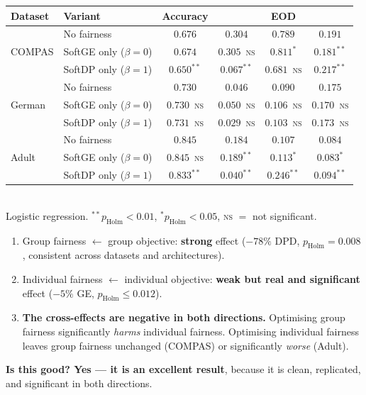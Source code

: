 \begin{center}
\scriptsize
\renewcommand{\arraystretch}{1.15}
\begin{tabular}{@{}llcccc@{}}
\toprule
\textbf{Dataset} & \textbf{Variant} & \textbf{Accuracy} & \textbf{\dpdtwo{}} & \textbf{EOD} & \textbf{\getwo{}} \\
\midrule
\multirow{3}{*}{COMPAS}
 & No fairness            & $0.676$ & $0.304$ & $0.789$ & $0.191$ \\
 & SoftGE only ($\beta{=}0$) & $0.674$ & $0.305$\ \textsc{ns} & $0.811^{*}$ & $\mathbf{0.181^{**}}$ \\
 & SoftDP only ($\beta{=}1$) & $0.650^{**}$ & $\mathbf{0.067^{**}}$ & $0.681$\ \textsc{ns} & $\mathbf{0.217^{**}}$ \\
\midrule
\multirow{3}{*}{German}
 & No fairness            & $0.730$ & $0.046$ & $0.090$ & $0.175$ \\
 & SoftGE only ($\beta{=}0$) & $0.730$\ \textsc{ns} & $0.050$\ \textsc{ns} & $0.106$\ \textsc{ns} & $0.170$\ \textsc{ns} \\
 & SoftDP only ($\beta{=}1$) & $0.731$\ \textsc{ns} & $0.029$\ \textsc{ns} & $0.103$\ \textsc{ns} & $0.173$\ \textsc{ns} \\
\midrule
\multirow{3}{*}{Adult}
 & No fairness            & $0.845$ & $0.184$ & $0.107$ & $0.084$ \\
 & SoftGE only ($\beta{=}0$) & $0.845$\ \textsc{ns} & $\mathbf{0.189^{**}}$ & $0.113^{*}$ & $\mathbf{0.083^{*}}$ \\
 & SoftDP only ($\beta{=}1$) & $0.833^{**}$ & $\mathbf{0.040^{**}}$ & $\mathbf{0.246^{**}}$ & $\mathbf{0.094^{**}}$ \\
\bottomrule
\end{tabular}
\\[3pt]
\footnotesize Logistic regression. $^{**}p_{\mathrm{Holm}}<0.01$,
$^{*}p_{\mathrm{Holm}}<0.05$, \textsc{ns} $=$ not significant.
\end{center}

\begin{keybox}
\begin{enumerate}
\item Group fairness $\leftarrow$ group objective: \textbf{strong} effect
($-78\%$ DPD, $p_{\mathrm{Holm}} = 0.008$, consistent across datasets and
architectures).
\item Individual fairness $\leftarrow$ individual objective: \textbf{weak but
real and significant} effect ($-5\%$ GE, $p_{\mathrm{Holm}} \le 0.012$).
\item \textbf{The cross-effects are negative in both directions.} Optimising
group fairness significantly \emph{harms} individual fairness. Optimising
individual fairness leaves group fairness unchanged (COMPAS) or significantly
\emph{worse} (Adult).
\end{enumerate}
\textbf{Is this good? Yes --- it is an excellent result}, because it is clean,
replicated, and significant in both directions.
\end{keybox}

